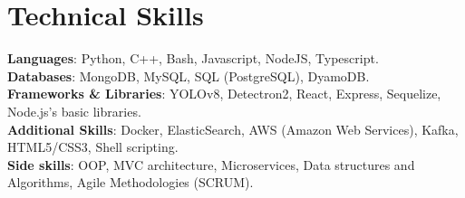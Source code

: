 \documentclass[letterpaper,11pt]{article}
\begin{document}
%
\section{Technical Skills}
\begin{itemize}[leftmargin=0.15in, label={}]
  \small{\item{
        \textbf{Languages}{: Python, C++, Bash, Javascript, NodeJS, Typescript.} \\
        \textbf{Databases}{: MongoDB, MySQL, SQL (PostgreSQL), DyamoDB.} \\
        \textbf{Frameworks \& Libraries}{: YOLOv8, Detectron2, React, Express, Sequelize, Node.js's basic libraries.} \\
        \textbf{Additional Skills}{: Docker, ElasticSearch, AWS (Amazon Web Services), Kafka, HTML5/CSS3, Shell scripting.} \\
        \textbf{Side skills}{: OOP, MVC architecture, Microservices, Data structures and Algorithms, Agile Methodologies (SCRUM).}\\
        }}
\end{itemize}
\end{document}
